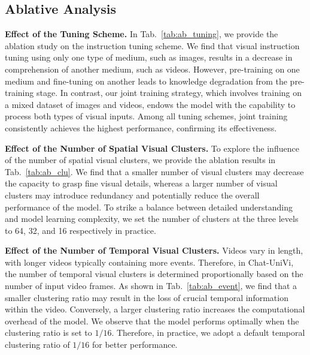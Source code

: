 \documentclass[10pt,twocolumn,letterpaper]{article}
\newcommand{\myparagraph}[1]{\textbf{#1}\hspace{1.8ex}}
\begin{document}
\subsection{Ablative Analysis}
\noindent \myparagraph{Effect of the Tuning Scheme.} 
In Tab.~\ref{tab:ab_tuning}, we provide the ablation study on the instruction tuning scheme. We find that visual instruction tuning using only one type of medium, such as images, results in a decrease in comprehension of another medium, such as videos. However, pre-training on one medium and fine-tuning on another leads to knowledge degradation from the pre-training stage. In contrast, our joint training strategy, which involves training on a mixed dataset of images and videos, endows the model with the capability to process both types of visual inputs. Among all tuning schemes, joint training consistently achieves the highest performance, confirming its effectiveness.

\noindent \myparagraph{Effect of the Number of Spatial Visual Clusters.} 
To explore the influence of the number of spatial visual clusters, we provide the ablation results in Tab.~\ref{tab:ab_clu}. We find that a smaller number of visual clusters may decrease the capacity to grasp fine visual details, whereas a larger number of visual clusters may introduce redundancy and potentially reduce the overall performance of the model. To strike a balance between detailed understanding and model learning complexity, we set the number of clusters at the three levels to 64, 32, and 16 respectively in practice.

\noindent \myparagraph{Effect of the Number of Temporal Visual Clusters.} Videos vary in length, with longer videos typically containing more events. Therefore, in Chat-UniVi, the number of temporal visual clusters is determined proportionally based on the number of input video frames. As shown in Tab.~\ref{tab:ab_event}, we find that a smaller clustering ratio may result in the loss of crucial temporal information within the video. Conversely, a larger clustering ratio increases the computational overhead of the model. We observe that the model performs optimally when the clustering ratio is set to $1/16$. Therefore, in practice, we adopt a default temporal clustering ratio of $1/16$ for better performance.
\end{document}
